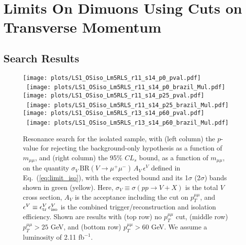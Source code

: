 \documentclass[aps,prd,twocolumn,superscriptaddress,preprintnumbers,nofootinbib,longbibliography,floatfix]{revtex4-1}
\newcommand{\ptmm}{p_T^{\mu\mu}}
\newcommand{\BR}{\text{BR}}
\newcommand{\inv}{$^{-1}$}
\DeclareRobustCommand{\Eq}[1]{Eq.~(\ref{#1})}
\begin{document}
\section{Limits On Dimuons Using Cuts on Transverse Momentum}
\label{sec:limits}

\subsection{Search Results}
\label{subsec:searchresults}


%
\begin{figure*}[t]  
\begin{center}  
\leavevmode
\vskip 0.0in
\texttt{[image: plots/LS1\_OSiso\_Lm5RLS\_r11\_s14\_p0\_pval.pdf]} \
\texttt{[image: plots/LS1\_OSiso\_Lm5RLS\_r11\_s14\_p0\_brazil\_Mul.pdf]} \\
\texttt{[image: plots/LS1\_OSiso\_Lm5RLS\_r11\_s14\_p25\_pval.pdf]} \
\texttt{[image: plots/LS1\_OSiso\_Lm5RLS\_r11\_s14\_p25\_brazil\_Mul.pdf]} \\
\texttt{[image: plots/LS1\_OSiso\_Lm5RLS\_r13\_s14\_p60\_pval.pdf]} \
\texttt{[image: plots/LS1\_OSiso\_Lm5RLS\_r13\_s14\_p60\_brazil\_Mul.pdf]} \\
\end{center}
\vskip -0.20in  
\caption{Resonance search for the isolated sample, with (left column) the $p$-value for rejecting the background-only hypothesis as a function of $m_{\mu\mu}$, and (right column) the 95\% $CL_s$ bound, as a function of $m_{\mu\mu}$, on the quantity $\sigma_V \, \BR (V\to\mu^+\mu^-) \, A_V \, \epsilon^V$ defined in  \Eq{eq:limit_iso}, with the expected bound and its 1$\sigma$ (2$\sigma$) bands shown in green (yellow). 
%
Here, $\sigma_V \equiv \sigma(pp\to V+X)$ is the total $V$ cross section, $A_V$ is the acceptance including the cut on $\ptmm$, and $\epsilon^V \equiv \epsilon^V_{\rm tr} \, \epsilon^V_{\rm iso}$ is the combined trigger/reconstruction and isolation efficiency.
%
Shown are results with (top row) no $\ptmm$ cut, (middle row) $\ptmm>25$ GeV, and (bottom row) $\ptmm>60$ GeV.
%
We assume a luminosity of 2.11 fb\inv.
%
}  
\label{fig:Prf2aOSisoPlots}
\end{figure*}
\end{document}
